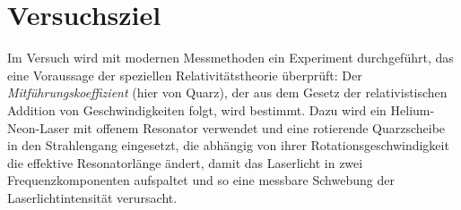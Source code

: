 \section{Versuchsziel}
Im Versuch wird mit modernen Messmethoden ein Experiment durchgeführt,
das eine Voraussage der speziellen Relativitätstheorie überprüft:
Der \emph{Mitführungskoeffizient} (hier von Quarz),
der aus dem Gesetz der relativistischen Addition von Geschwindigkeiten folgt, wird bestimmt.
Dazu wird ein Helium-Neon-Laser mit offenem Resonator verwendet und
eine rotierende Quarzscheibe in den Strahlengang eingesetzt,
die abhängig von ihrer Rotationsgeschwindigkeit die effektive Resonatorlänge ändert,
damit das Laserlicht in zwei Frequenzkomponenten aufspaltet und
so eine messbare Schwebung der Laserlichtintensität verursacht.
